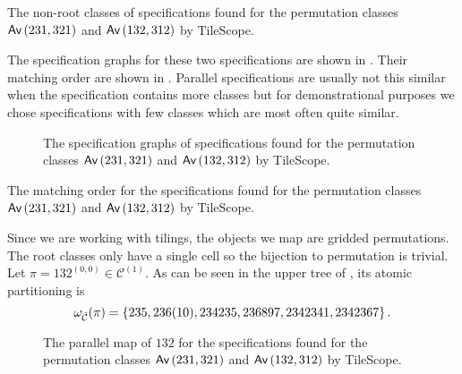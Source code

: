 \begin{table}[ht!]
    \centering
    
    \caption{The non-root classes of specifications found for the permutation classes $\textsf{Av}\left(231,321\right)$ and $\textsf{Av}\left(132,312\right)$ by TileScope.}
    \label{tab:parmapex}
\end{table}

The specification graphs for these two specifications are shown in . Their matching order are shown in . Parallel specifications are usually not this similar when the specification contains more classes but for demonstrational purposes we chose specifications with few classes which are most often quite similar.

\begin{figure}[ht!]
    \centering
    
    \caption{The specification graphs of specifications found for the permutation classes $\textsf{Av}\left(231,321\right)$ and $\textsf{Av}\left(132,312\right)$ by TileScope.}
    \label{fig:avexspecgraphs}
\end{figure}

\begin{table}[ht!]
    \centering
    
    \caption{The matching order for the specifications found for the permutation classes $\textsf{Av}\left(231,321\right)$ and $\textsf{Av}\left(132,312\right)$ by TileScope.}
    \label{tab:avexmatchingorder}
\end{table}

Since we are working with tilings, the objects we map are gridded permutations. The root classes only have a single cell so the bijection to permutation is trivial. Let $\pi=132^{(0,0)} \in \mathcal{C}^{(1)}$. As can be seen in the upper tree of , its atomic partitioning is 
\[
    \omega_{\check{\mathcal{C}}}(\pi) = \left\{235, 236(10), 234235,236897,2342341,2342367\right\}.
\]

\begin{figure}[!htbp]
    \centering
    
    \caption{The parallel map of $132$ for the specifications found for the permutation classes $\textsf{Av}\left(231,321\right)$ and $\textsf{Av}\left(132,312\right)$ by TileScope.}
    \label{fig:mapexap}
\end{figure}

